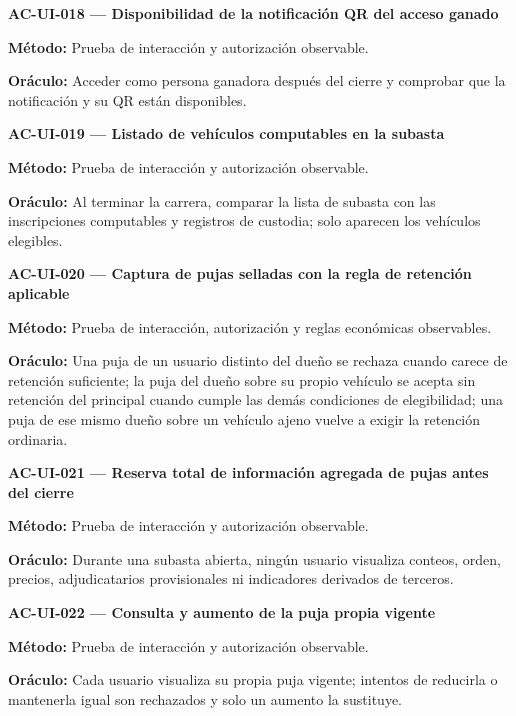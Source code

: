 \documentclass[10pt,letterpaper]{article}
\begin{document}
\noindent\textbf{AC-UI-018 --- Disponibilidad de la notificación QR del acceso ganado}\par
\textbf{Método:} Prueba de interacción y autorización observable.\par
\textbf{Oráculo:} Acceder como persona ganadora después del cierre y comprobar que la notificación y su QR están disponibles.\par\vspace{0.45em}
\noindent\textbf{AC-UI-019 --- Listado de vehículos computables en la subasta}\par
\textbf{Método:} Prueba de interacción y autorización observable.\par
\textbf{Oráculo:} Al terminar la carrera, comparar la lista de subasta con las inscripciones computables y registros de custodia; solo aparecen los vehículos elegibles.\par\vspace{0.45em}
\noindent\textbf{AC-UI-020 --- Captura de pujas selladas con la regla de retención aplicable}\par
\textbf{Método:} Prueba de interacción, autorización y reglas económicas observables.\par
\textbf{Oráculo:} Una puja de un usuario distinto del dueño se rechaza cuando carece de retención suficiente; la puja del dueño sobre su propio vehículo se acepta sin retención del principal cuando cumple las demás condiciones de elegibilidad; una puja de ese mismo dueño sobre un vehículo ajeno vuelve a exigir la retención ordinaria.\par\vspace{0.45em}
\noindent\textbf{AC-UI-021 --- Reserva total de información agregada de pujas antes del cierre}\par
\textbf{Método:} Prueba de interacción y autorización observable.\par
\textbf{Oráculo:} Durante una subasta abierta, ningún usuario visualiza conteos, orden, precios, adjudicatarios provisionales ni indicadores derivados de terceros.\par\vspace{0.45em}
\noindent\textbf{AC-UI-022 --- Consulta y aumento de la puja propia vigente}\par
\textbf{Método:} Prueba de interacción y autorización observable.\par
\textbf{Oráculo:} Cada usuario visualiza su propia puja vigente; intentos de reducirla o mantenerla igual son rechazados y solo un aumento la sustituye.\par\vspace{0.45em}
\end{document}
